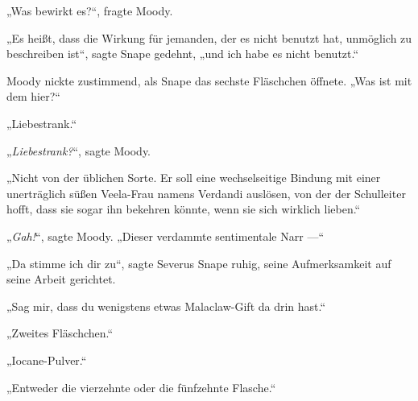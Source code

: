 „Was bewirkt es?“, fragte Moody.

„Es heißt, dass die Wirkung für jemanden, der es nicht benutzt hat, unmöglich zu beschreiben ist“, sagte Snape gedehnt, „und ich habe es nicht benutzt.“

Moody nickte zustimmend, als Snape das sechste Fläschchen öffnete.
„Was ist mit dem hier?“

„Liebestrank.“

„\emph{Liebestrank?}“, sagte Moody.

„Nicht von der üblichen Sorte. Er soll eine wechselseitige Bindung mit einer unerträglich süßen Veela-Frau namens Verdandi auslösen, von der der Schulleiter hofft, dass sie sogar ihn bekehren könnte, wenn sie sich wirklich lieben.“

„\emph{Gah!}“, sagte Moody.
„Dieser verdammte sentimentale Narr —“

„Da stimme ich dir zu“, sagte Severus Snape ruhig, seine Aufmerksamkeit auf seine Arbeit gerichtet.

„Sag mir, dass du wenigstens etwas Malaclaw-Gift da drin hast.“

„Zweites Fläschchen.“

„Iocane-Pulver.“

„Entweder die vierzehnte oder die fünfzehnte Flasche.“

